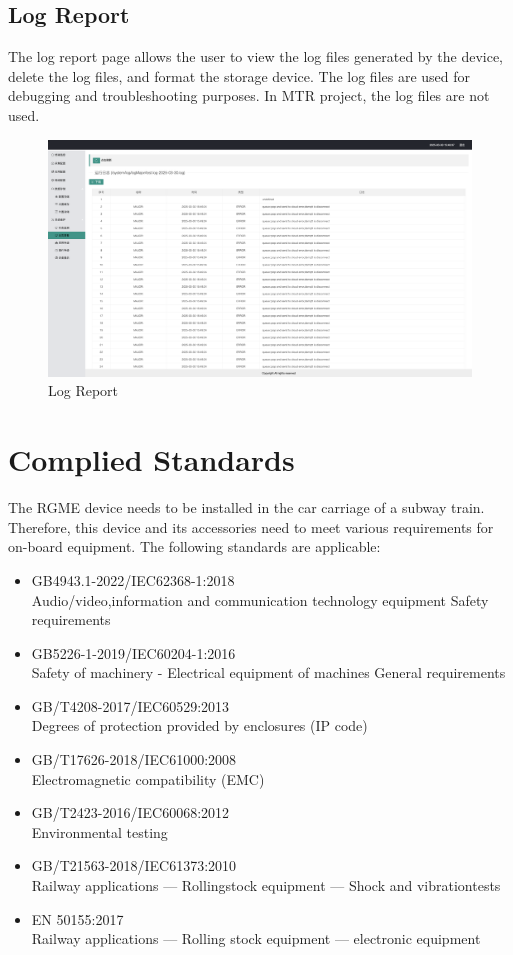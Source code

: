 \documentclass{article}
\begin{document}
\subsection{Log Report}

The log report page allows the user to view the log files generated by the device, delete the log files, and format the storage device. The log files are used for debugging and troubleshooting purposes. In MTR project, the log files are not used.
\begin{figure} [H]
    \centering
    \includegraphics[width=1\textwidth]{MMI_log.png}
    \caption{Log Report}    
\end{figure}

\clearpage
\section{Complied Standards}
The RGME device needs to be installed in the car carriage of a subway train. Therefore, this device and its accessories need to meet various requirements for on-board equipment. The following standards are applicable:
\begin{itemize}
    \item GB4943.1-2022/IEC62368-1:2018 \\Audio/video,information and communication technology equipment Safety requirements
    \item GB5226-1-2019/IEC60204-1:2016 \\Safety of machinery - Electrical equipment of machines General requirements
    \item GB/T4208-2017/IEC60529:2013 \\Degrees of protection provided by enclosures (IP code)
    \item GB/T17626-2018/IEC61000:2008 \\Electromagnetic compatibility (EMC)
    \item GB/T2423-2016/IEC60068:2012 \\Environmental testing
    \item GB/T21563-2018/IEC61373:2010 \\Railway applications — Rollingstock equipment — Shock and vibrationtests
    \item EN 50155:2017 \\Railway applications — Rolling stock equipment — electronic equipment
\end{itemize}
\clearpage
\end{document}
